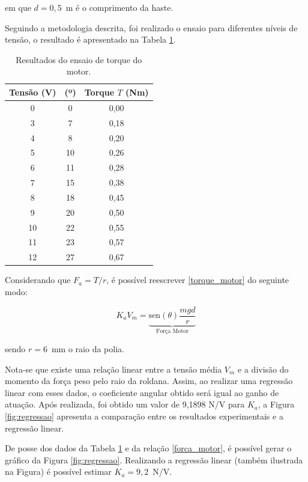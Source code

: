 \noindent em que $d = 0,5$~m é o comprimento da haste.

Seguindo a metodologia descrita, foi realizado o ensaio para diferentes níveis de tensão, o resultado é apresentado na Tabela \ref{tab:ensaio_motor}.

\begin{table}[H]
    \centering
    \caption[Resultados do ensaio de torque do motor]{Resultados do ensaio de torque do motor.}
    \begin{tabular}{c|c|c}
    \textbf{Tensão (V)}  & \bm{$\theta$} \textbf{(º)} & \textbf{Torque $T$ (Nm)}\\ \hline
    0 & 0 & 0,00 \\ 
    3 & 7 & 0,18 \\ 
    4 & 8 & 0,20 \\ 
    5 & 10 & 0,26 \\ 
    6 & 11 & 0,28 \\ 
    7 & 15 & 0,38 \\ 
    8 & 18 & 0,45 \\ 
    9 & 20 & 0,50 \\ 
    10 & 22 & 0,55 \\ 
    11 & 23 & 0,57 \\ 
    12 & 27 & 0,67 \\ 
    \end{tabular}
    \label{tab:ensaio_motor}
\end{table}

Considerando que $F_a = T/r$, é possível reescrever \eqref{torque_motor} do seguinte modo:

\begin{equation}
    K_aV_m = \underbrace{\text{sen}(\theta)\frac{mgd}{r}}_{\text{Força Motor}}
    \label{forca_motor}
\end{equation}

\noindent sendo $r=6$~mm o raio da polia.

Nota-se que existe uma relação linear entre a tensão média $V_m$ e a divisão do momento da força peso pelo raio da roldana. Assim, ao realizar uma regressão linear com esses dados, o coeficiente angular obtido será igual ao ganho de atuação. Após realizada, foi obtido um valor de 9,1898 N/V
para $K_a$, a Figura \ref{fig:regressao} apresenta a comparação entre os resultados experimentais e a regressão linear.

De posse dos dados da Tabela \ref{tab:ensaio_motor} e da relação \eqref{forca_motor}, é possível gerar o gráfico da Figura \ref{fig:regressao}. Realizando a regressão linear (também ilustrada na Figura) é possível estimar $K_a = 9,2$~N/V.


